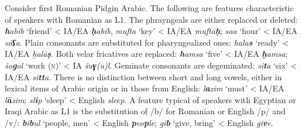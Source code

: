 \documentclass[output=paper]{langsci/langscibook}
\begin{document}
Consider first Romanian Pidgin Arabic. The following are features characteristic of speakers with Romanian as L1. The phrayngeals are either replaced or deleted: \textit{\textbf{h}abib} ‘friend’ < IA/EA \textit{\textbf{ḥ}abīb}, \textit{mufta} ‘key’ < IA/EA \textit{muftā\textbf{ḥ}}; \textit{saa} ‘hour’ < IA/EA \textit{sā\textbf{ʕ}a}. Plain consonants are substituted for pharyngealized ones: \textit{hala\textbf{s}} ‘ready’ < IA/EA \textit{ḫalā\textbf{ṣ}}. Both velar fricatives are replaced: \textit{\textbf{h}amsa} ‘five’ < IA/EA \textit{\textbf{ḫ}amsa}; \textit{šo\textbf{g}ol} ‘work (\textsc{n})’ < IA \textit{šu\textbf{ɣ}(u)l}. Geminate consonants are degeminated: \textit{si\textbf{t}a} ‘six’ < IA/EA \textit{si\textbf{tt}a}. There is no distinction between short and long vowels, either in lexical items of Arabic origin or in those from English: \textit{l\textbf{a}zim} ‘must’ < IA/EA \textit{l\textbf{ā}zim}; \textit{sl\textbf{i}p} ‘sleep’ < English \textit{sleep}. A feature typical of speakers with Egyptian or Iraqi Arabic as L1 is the substitution of /b/ for Romanian or English /p/ and /v/: \textit{\textbf{b}i\textbf{b}ul} ‘people, men’ < English \textit{\textbf{p}eo\textbf{p}le}; \textit{gi\textbf{b}} ‘give, bring’ < English \textit{gi\textbf{v}e}.
\end{document}

